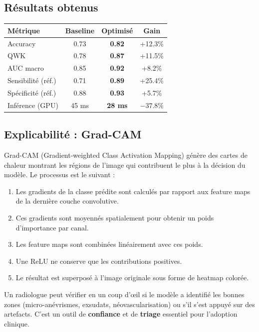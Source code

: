 \documentclass[11pt,a4paper]{article}
\begin{document}
\subsection{Résultats obtenus}

\begin{center}
\renewcommand{\arraystretch}{1.3}
\begin{tabular}{lccc}
\toprule
\textbf{Métrique} & \textbf{Baseline} & \textbf{Optimisé} & \textbf{Gain} \\
\midrule
Accuracy & 0.73 & \textbf{0.82} & +12.3\% \\
QWK & 0.78 & \textbf{0.87} & +11.5\% \\
AUC macro & 0.85 & \textbf{0.92} & +8.2\% \\
Sensibilité (réf.) & 0.71 & \textbf{0.89} & +25.4\% \\
Spécificité (réf.) & 0.88 & \textbf{0.93} & +5.7\% \\
Inférence (GPU) & 45 ms & \textbf{28 ms} & $-37.8\%$ \\
\bottomrule
\end{tabular}
\end{center}

\subsection{Explicabilité : Grad-CAM}

Grad-CAM (Gradient-weighted Class Activation Mapping) génère des cartes de chaleur montrant les régions de l'image qui contribuent le plus à la décision du modèle. Le processus est le suivant :

\begin{enumerate}[leftmargin=2em]
  \item Les gradients de la classe prédite sont calculés par rapport aux feature maps de la dernière couche convolutive.
  \item Ces gradients sont moyennés spatialement pour obtenir un poids d'importance par canal.
  \item Les feature maps sont combinées linéairement avec ces poids.
  \item Une ReLU ne conserve que les contributions positives.
  \item Le résultat est superposé à l'image originale sous forme de heatmap colorée.
\end{enumerate}

\begin{tipbox}
Un radiologue peut vérifier en un coup d'œil si le modèle a identifié les bonnes zones (micro-anévrismes, exsudats, néovascularisation) ou s'il s'est appuyé sur des artefacts. C'est un outil de \textbf{confiance} et de \textbf{triage} essentiel pour l'adoption clinique.
\end{tipbox}
\end{document}
